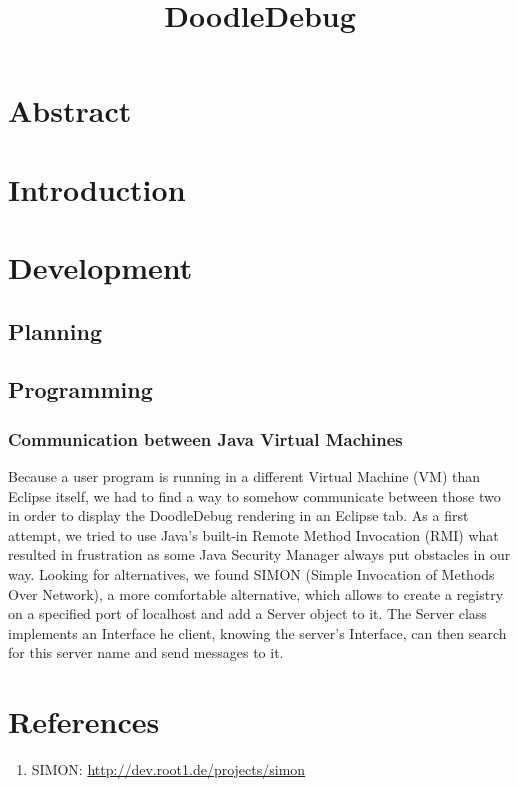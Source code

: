 \documentclass{report}
\title{DoodleDebug}
\begin{document}
\maketitle

\chapter*{Abstract}

\chapter*{Introduction}

\chapter*{Development}
\section*{Planning}

\section*{Programming}
\subsection*{Communication between Java Virtual Machines}
Because a user program is running in a different Virtual Machine (VM) than Eclipse itself, we had to find a way to somehow communicate between those two in order to display the DoodleDebug rendering in an Eclipse tab. As a first attempt, we tried to use Java's built-in Remote Method Invocation (RMI) what resulted in frustration as some Java Security Manager always put obstacles in our way. Looking for alternatives, we found SIMON (Simple Invocation of Methods Over Network), a more comfortable alternative, which allows to create a registry on a specified port of localhost and add a Server object to it. The Server class implements an Interface he client, knowing the server's Interface, can then search for this server name and send messages to it.

\chapter*{References}
\begin{enumerate}
\item
SIMON: \url{http://dev.root1.de/projects/simon}
\end{enumerate}
\end{document}
